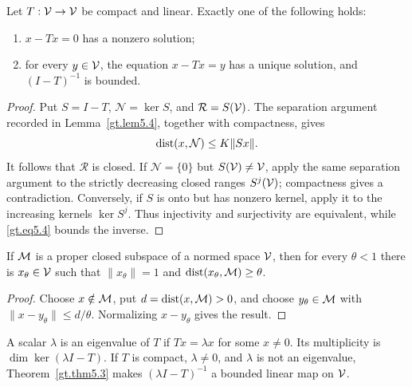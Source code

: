 \begin{theorem}\label{gt.thm5.3}

Let $T:\mathcal{V}\to\mathcal{V}$ be compact and linear. Exactly one of the following holds:
\begin{enumerate}
\item $x-Tx=0$ has a nonzero solution;
\item for every $y\in\mathcal{V}$, the equation $x-Tx=y$ has a unique solution, and
$(I-T)^{-1}$ is bounded.
\end{enumerate}
\end{theorem}
\begin{proof}
\sketch Put $S=I-T$, $\mathcal N=\ker S$, and $\mathcal R=S(\mathcal{V})$. The
separation argument recorded in Lemma~\ref{gt.lem5.4}, together with
compactness, gives
\begin{equation}\label{gt.eq5.4}
\operatorname{dist}(x,\mathcal N)\leq K\|Sx\|.
\end{equation}
It follows that $\mathcal R$ is closed. If $\mathcal N=\{0\}$ but
$S(\mathcal{V})\neq\mathcal{V}$, apply the same separation argument to the strictly decreasing
closed ranges $S^j(\mathcal{V})$; compactness gives a contradiction. Conversely, if
$S$ is onto but has nonzero kernel, apply it to the increasing kernels
$\ker S^j$. Thus injectivity and surjectivity are equivalent, while
\eqref{gt.eq5.4} bounds the inverse.
\end{proof}

\begin{lemma}\label{gt.lem5.4}

If $\mathcal{M}$ is a proper closed subspace of a normed space $\mathcal{V}$, then for every
$\theta<1$ there is $x_\theta\in\mathcal{V}$ such that
$\|x_\theta\|=1$ and $\operatorname{dist}(x_\theta,\mathcal{M})\geq\theta$.
\end{lemma}
\begin{proof}

\sketch Choose $x\notin\mathcal{M}$, put $d=\operatorname{dist}(x,\mathcal{M})>0$, and choose
$y_\theta\in\mathcal{M}$ with $\|x-y_\theta\|\leq d/\theta$. Normalizing
$x-y_\theta$ gives the result.
\end{proof}

\begin{definition}\label{gt.def5.3.eigenvalue}

A scalar $\lambda$ is an eigenvalue of $T$ if $Tx=\lambda x$ for some
$x\neq0$. Its multiplicity is $\dim\ker(\lambda I-T)$. If $T$ is compact,
$\lambda\neq0$, and $\lambda$ is not an eigenvalue, Theorem~\ref{gt.thm5.3}
makes $(\lambda I-T)^{-1}$ a bounded linear map on $\mathcal{V}$.
\end{definition}

